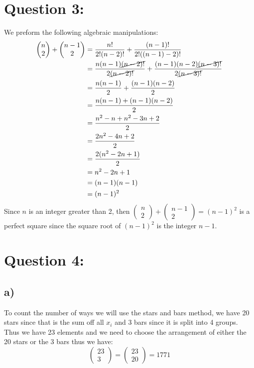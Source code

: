\documentclass{article}
\begin{document}
\section*{Question 3:}
We preform the following algebraic manipulations: 
$$\begin{aligned}
    \begin{pmatrix}
        n\\2
    \end{pmatrix}+\begin{pmatrix}
        n-1\\2
    \end{pmatrix}&=\frac{n!}{2!(n-2)!}+\frac{(n-1)!}{2!((n-1)-2)!}\\
    &=\frac{n(n-1)\cancel{(n-2)!}}{2\cancel{(n-2)!}}+\frac{(n-1)(n-2)\cancel{(n-3)!}}{2\cancel{(n-3)!}}\\
    &=\frac{n(n-1)}{2}+\frac{(n-1)(n-2)}{2}\\
    &=\frac{n(n-1)+(n-1)(n-2)}{2}\\
    &=\frac{n^{2}-n+n^{2}-3n+2}{2}\\
    &=\frac{2n^{2}-4n+2}{2}\\
    &=\frac{2(n^{2}-2n+1)}{2}\\
    &=n^{2}-2n+1\\
    &=(n-1)(n-1)\\
    &=(n-1)^{2} 
\end{aligned}$$
Since $n$ is an integer greater than 2, then $\begin{pmatrix}
    n\\2
\end{pmatrix}+\begin{pmatrix}
    n-1\\2
\end{pmatrix}=(n-1)^{2}$ is a perfect square since the square root of $(n-1)^{2}$ is the integer $n-1$.

\newpage
\section*{Question 4:}
\subsection*{a)}
To count the number of ways we will use the stars and bars method, we have 20 stars since that is the sum off all $x_{i}$ and 3 bars since it is split into 4 groups. Thus we have 23 elements and we need to choose the arrangement of either the 20 stars or the 3 bars thus we have: $$\begin{pmatrix}
    23\\3
\end{pmatrix}=\begin{pmatrix}
    23\\20
\end{pmatrix}=\boxed{1771}$$
\end{document}
